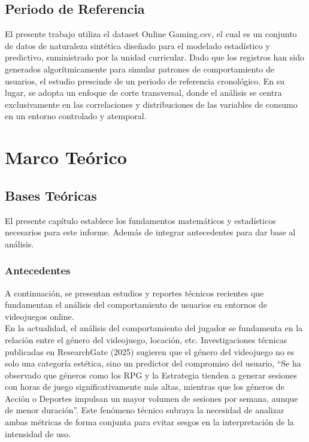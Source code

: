 \documentclass[oneside,11pt]{Latex/Classes/PhDthesisPSnPDF}
\begin{document}
\section{Periodo de Referencia}

El presente trabajo utiliza el dataset Online Gaming.csv, el cual es un
conjunto de datos de naturaleza sintética diseñado para el modelado
estadístico y predictivo, suministrado por la unidad curricular. Dado
que los registros han sido generados algorítmicamente para simular
patrones de comportamiento de usuarios, el estudio prescinde de un
periodo de referencia cronológico. En su lugar, se adopta un enfoque de
corte transversal, donde el análisis se centra exclusivamente en las
correlaciones y distribuciones de las variables de consumo en un entorno
controlado y atemporal.

\chapter{Marco Teórico}

\section{Bases Teóricas}

El presente capítulo establece los fundamentos matemáticos y
estadísticos necesarios para este informe. Además de integrar
antecedentes para dar base al análisis.

\subsection{Antecedentes}

A continuación, se presentan estudios y reportes técnicos recientes que
fundamentan el análisis del comportamiento de usuarios en entornos de
videojuegos online.\\

En la actualidad, el análisis del comportamiento del jugador se
fundamenta en la relación entre el género del videojuego, locación, etc.
Investigaciones técnicas publicadas en ResearchGate (2025) sugieren que
el género del videojuego no es solo una categoría estética, sino un
predictor del compromiso del usuario, ``Se ha observado que géneros como
los RPG y la Estrategia tienden a generar sesiones con horas de juego
significativamente más altas, mientras que los géneros de Acción o
Deportes impulsan un mayor volumen de sesiones por semana, aunque de
menor duración''. Este fenómeno técnico subraya la necesidad de analizar
ambas métricas de forma conjunta para evitar sesgos en la interpretación
de la intensidad de uso.\\
\end{document}
